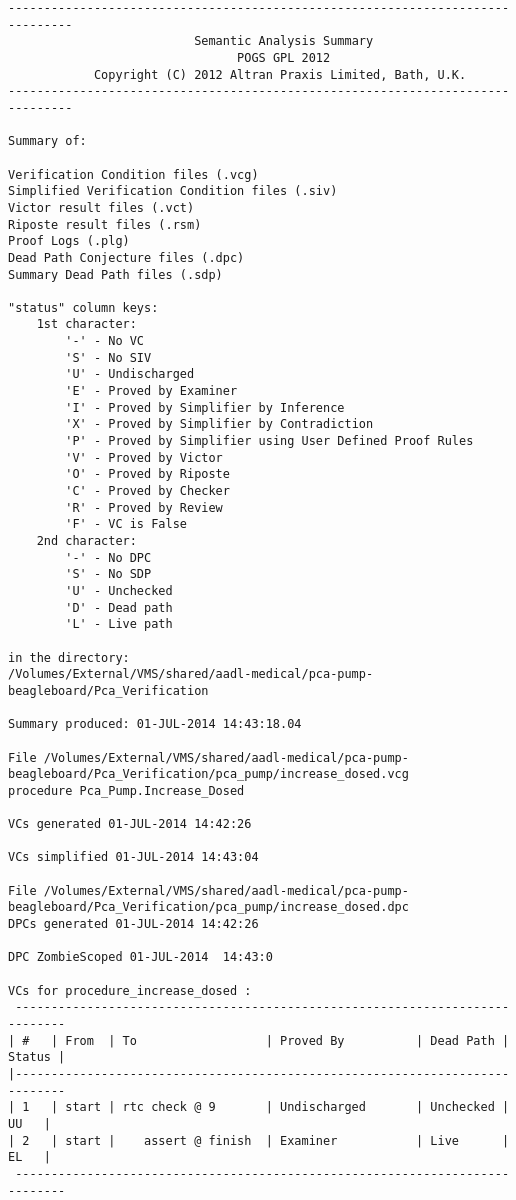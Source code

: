 \begin{lstlisting}[frame=single, gobble=0, caption={POGS report}, label={listing:pcapump_dosemonitor_pogs}]
-------------------------------------------------------------------------------
                          Semantic Analysis Summary                            
                                POGS GPL 2012                                  
            Copyright (C) 2012 Altran Praxis Limited, Bath, U.K.               
-------------------------------------------------------------------------------

Summary of:

Verification Condition files (.vcg)
Simplified Verification Condition files (.siv)
Victor result files (.vct)
Riposte result files (.rsm)
Proof Logs (.plg)
Dead Path Conjecture files (.dpc)
Summary Dead Path files (.sdp)

"status" column keys:
    1st character:
        '-' - No VC
        'S' - No SIV
        'U' - Undischarged
        'E' - Proved by Examiner
        'I' - Proved by Simplifier by Inference
        'X' - Proved by Simplifier by Contradiction
        'P' - Proved by Simplifier using User Defined Proof Rules
        'V' - Proved by Victor
        'O' - Proved by Riposte
        'C' - Proved by Checker
        'R' - Proved by Review
        'F' - VC is False
    2nd character:
        '-' - No DPC
        'S' - No SDP
        'U' - Unchecked
        'D' - Dead path
        'L' - Live path

in the directory:
/Volumes/External/VMS/shared/aadl-medical/pca-pump-beagleboard/Pca_Verification

Summary produced: 01-JUL-2014 14:43:18.04

File /Volumes/External/VMS/shared/aadl-medical/pca-pump-beagleboard/Pca_Verification/pca_pump/increase_dosed.vcg
procedure Pca_Pump.Increase_Dosed

VCs generated 01-JUL-2014 14:42:26

VCs simplified 01-JUL-2014 14:43:04

File /Volumes/External/VMS/shared/aadl-medical/pca-pump-beagleboard/Pca_Verification/pca_pump/increase_dosed.dpc
DPCs generated 01-JUL-2014 14:42:26

DPC ZombieScoped 01-JUL-2014  14:43:0

VCs for procedure_increase_dosed :
 -----------------------------------------------------------------------------
| #   | From  | To                  | Proved By          | Dead Path | Status |
|-----------------------------------------------------------------------------
| 1   | start | rtc check @ 9       | Undischarged       | Unchecked |   UU   |
| 2   | start |    assert @ finish  | Examiner           | Live      |   EL   |
 -----------------------------------------------------------------------------



\end{lstlisting}
